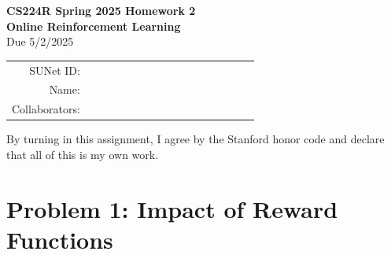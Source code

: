 \documentclass[12pt]{article}
\begin{document}
\begin{center}
{\Large \textbf{CS224R Spring 2025 Homework 2 \\ Online Reinforcement Learning}}
\\ {\large Due 5/2/2025}

\begin{tabular}{rl}
SUNet ID: & $\hspace{6cm}$\\
Name: & \\
Collaborators: & 
\end{tabular}
\end{center}

\noindent By turning in this assignment, I agree by the Stanford honor code and declare
that all of this is my own work.

\newpage
\section*{Problem 1: Impact of Reward Functions}
\end{document}
